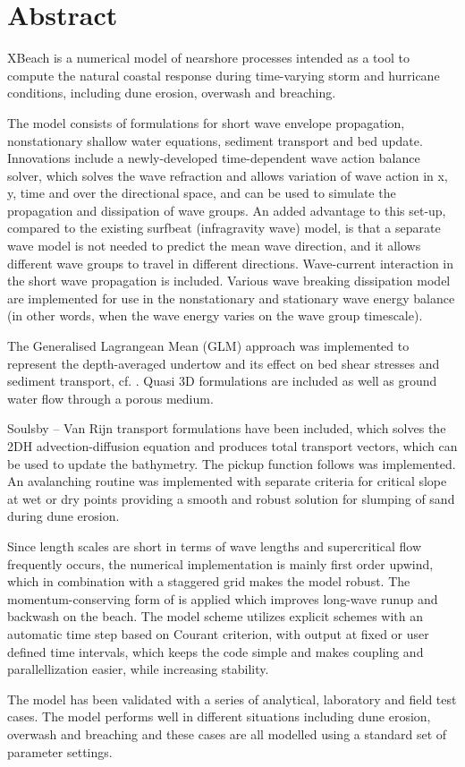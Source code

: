 \chapter*{Abstract}

XBeach is a numerical model of nearshore processes intended as a tool to compute the natural coastal response during time-varying storm and hurricane conditions, including dune erosion, overwash and breaching.

The model consists of formulations for short wave envelope propagation, nonstationary shallow water equations, sediment transport and bed update. Innovations include a newly-developed time-dependent wave action balance solver, which solves the wave refraction and allows variation of wave action in x, y, time and over the directional space, and can be used to simulate the propagation and dissipation of wave groups. An added advantage to this set-up, compared to the existing surfbeat (infragravity wave) model, is that a separate wave model is not needed to predict the mean wave direction, and it allows different wave groups to travel in different directions. Wave-current interaction in the short wave propagation is included. Various wave breaking dissipation model are implemented for use in the nonstationary and stationary wave energy balance (in other words, when the wave energy varies on the wave group timescale).

The Generalised Lagrangean Mean (GLM) approach was implemented to represent the depth-averaged undertow and its effect on bed shear stresses and sediment transport, cf. \citep{Reniers2004}. Quasi 3D formulations are included as well as ground water flow through a porous medium.

Soulsby -- Van Rijn transport formulations have been included, which solves the 2DH advection-diffusion equation and produces total transport vectors, which can be used to update the bathymetry. The pickup function follows \citet{Reniers2004} was implemented.  An avalanching routine was implemented with separate criteria for critical slope at wet or dry points providing a smooth and robust solution for slumping of sand during dune erosion.

Since length scales are short in terms of wave lengths and supercritical flow frequently occurs, the numerical implementation is mainly first order upwind, which in combination with a staggered grid makes the model robust.  The momentum-conserving form of \citet{Stelling2003} is applied which improves long-wave runup and backwash on the beach. The model scheme utilizes explicit schemes with an automatic time step based on Courant criterion, with output at fixed or user defined time intervals, which keeps the code simple and makes coupling and parallellization easier, while increasing stability. 

The model has been validated with a series of analytical, laboratory and field test cases. The model performs well in different situations including dune erosion, overwash and breaching and these cases are all modelled using a standard set of parameter settings. 

